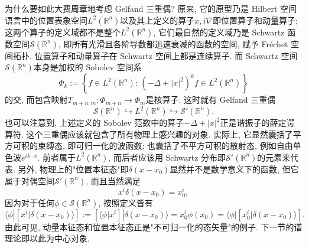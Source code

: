       为什么要如此大费周章地考虑 Gelfand 三重偶? 原来, 它的原型乃是 Hilbert 空间语言中的位置表象空间$L^2(\mathbb{R}^n)$以及其上定义的算子$x,i\nabla$即位置算子和动量算子; 这两个算子的定义域都不是整个$L^2(\mathbb{R}^n)$, 它们最自然的定义域乃是 Schwartz 函数空间$\mathcal{S}(\mathbb{R}^n)$, 即所有光滑且各阶导数都迅速衰减的函数的空间, 赋予 Fréchet 空间拓扑. 位置算子和动量算子在 Schwartz 空间上都是连续算子. 而 Schwartz 空间$\mathcal{S}(\mathbb{R}^n)$本身是加权的 Sobolev 空间系
$$
\Phi_k:=\left\{f\in L^2(\mathbb{R}^n):\,(-\Delta+|x|^2)^{k}f\in L^2(\mathbb{R}^n)\right\}
$$
的交, 而包含映射$T_{m+n,m}:\Phi_{m+n}\to\Phi_m$是核算子. 这时就有 Gelfand 三重偶$$
\mathcal{S}(\mathbb{R}^n)\hookrightarrow L^2(\mathbb{R}^n)\hookrightarrow \mathcal{S}'(\mathbb{R}^n).
$$也可以注意到, 上述定义的 Sobolev 范数中的算子$-\Delta+|x|^2$正是谐振子的薛定谔算符.
      这个三重偶应该就包含了所有物理上感兴趣的对象. 实际上, 它显然囊括了平方可积的束缚态, 即可归一化的波函数; 也囊括了不平方可积的散射态, 例如自由单色波$e^{ik\cdot x}$. 前者属于$L^2(\mathbb{R}^n)$, 而后者应该用 Schwartz 分布即$\mathcal{S}'(\mathbb{R}^n)$的元素来代表. 另外, 物理上的"位置本征态"即$\delta(x-x_0)$显然并不是数学意义下的函数, 但它属于对偶空间$\mathcal{S}'(\mathbb{R}^n)$, 而且当然满足$$
x^i\delta(x-x_0)=x_0^i,
$$因为对于任何$\phi\in\mathcal{S}(\mathbb{R}^n)$, 按照定义皆有$$
\langle\phi|\left[x^i|\delta(x-x_0)\rangle\right]:=\left[\langle\phi|x^i\right]|\delta(x-x_0)\rangle
=x_0^i\phi(x_0)=\langle\phi|\left[x_0^i|\delta(x-x_0)\rangle\right].
$$由此可见, 动量本征态和位置本征态正是"不可归一化的态矢量"的例子. 下一节的谱理论即以此为中心对象.